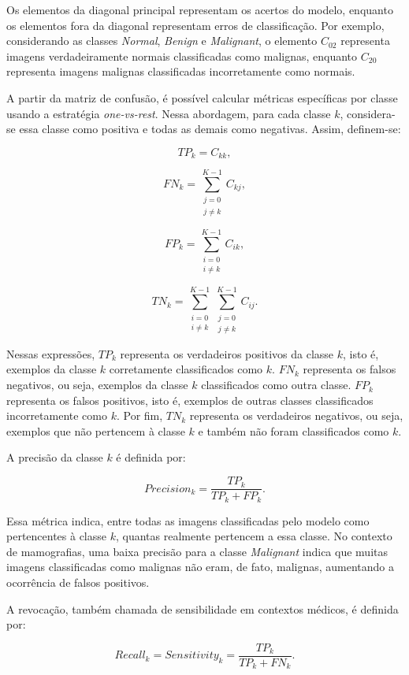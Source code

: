 \documentclass[
    12pt,
    openright,
    oneside,
    a4paper,
    english,
    brazil
]{abntex2}
\begin{document}
Os elementos da diagonal principal representam os acertos do modelo, enquanto os elementos fora da diagonal representam erros de classificação. Por exemplo, considerando as classes \textit{Normal}, \textit{Benign} e \textit{Malignant}, o elemento \(C_{02}\) representa imagens verdadeiramente normais classificadas como malignas, enquanto \(C_{20}\) representa imagens malignas classificadas incorretamente como normais.

A partir da matriz de confusão, é possível calcular métricas específicas por classe usando a estratégia \textit{one-vs-rest}. Nessa abordagem, para cada classe \(k\), considera-se essa classe como positiva e todas as demais como negativas. Assim, definem-se:

\[
TP_k = C_{kk},
\]

\[
FN_k =
\sum_{\substack{j=0 \\ j \neq k}}^{K-1}
C_{kj},
\]

\[
FP_k =
\sum_{\substack{i=0 \\ i \neq k}}^{K-1}
C_{ik},
\]

\[
TN_k =
\sum_{\substack{i=0 \\ i \neq k}}^{K-1}
\sum_{\substack{j=0 \\ j \neq k}}^{K-1}
C_{ij}.
\]

Nessas expressões, \(TP_k\) representa os verdadeiros positivos da classe \(k\), isto é, exemplos da classe \(k\) corretamente classificados como \(k\). \(FN_k\) representa os falsos negativos, ou seja, exemplos da classe \(k\) classificados como outra classe. \(FP_k\) representa os falsos positivos, isto é, exemplos de outras classes classificados incorretamente como \(k\). Por fim, \(TN_k\) representa os verdadeiros negativos, ou seja, exemplos que não pertencem à classe \(k\) e também não foram classificados como \(k\).

A precisão da classe \(k\) é definida por:

\[
Precision_k =
\frac{TP_k}{TP_k + FP_k}.
\]

Essa métrica indica, entre todas as imagens classificadas pelo modelo como pertencentes à classe \(k\), quantas realmente pertencem a essa classe. No contexto de mamografias, uma baixa precisão para a classe \textit{Malignant} indica que muitas imagens classificadas como malignas não eram, de fato, malignas, aumentando a ocorrência de falsos positivos.

A revocação, também chamada de sensibilidade em contextos médicos, é definida por:

\[
Recall_k = Sensitivity_k =
\frac{TP_k}{TP_k + FN_k}.
\]
\end{document}
